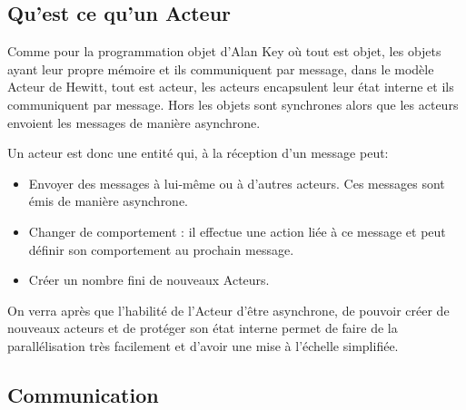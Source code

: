 \documentclass[11pt, a4paper]{article}
\begin{document}
\subsection{Qu'est ce qu'un Acteur}

Comme pour la programmation objet d'Alan Key où tout est objet, les objets ayant leur propre mémoire et ils communiquent par message, dans le modèle Acteur de Hewitt, tout est acteur, les acteurs encapsulent leur état interne et ils communiquent par message. Hors les objets sont synchrones alors que les acteurs envoient les messages de manière asynchrone. 
\par 
Un acteur est donc une entité qui, à la réception d'un message peut: 
\begin{itemize}
\item Envoyer des messages à lui-même ou à d'autres acteurs. Ces messages sont émis de manière asynchrone.
\item Changer de comportement : il effectue une action liée à ce message et peut définir son comportement au prochain message.
\item Créer un nombre fini de nouveaux Acteurs.
\end{itemize}
On verra après que l'habilité de l'Acteur d'être asynchrone, de pouvoir créer de nouveaux acteurs et de protéger son état interne permet de faire de la parallélisation très facilement et d'avoir une mise à l'échelle simplifiée.

\subsection{Communication}
\end{document}
